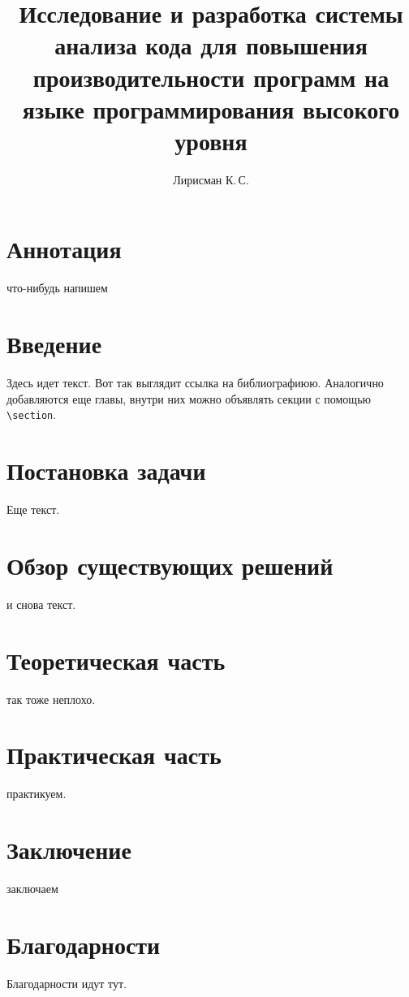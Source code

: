 \documentclass{mipt-thesis-bs}
\title{Исследование и разработка системы анализа кода для повышения производительности программ на языке программирования высокого уровня}
\author{Лирисман К.\,С.}
\begin{document}
\frontmatter
\titlecontents

\chapter{Аннотация}
что-нибудь напишем

\mainmatter


\chapter{Введение}

Здесь идет текст. Вот так выглядит ссылка на библиографиюю. Аналогично добавляются еще главы, внутри них можно объявлять секции с помощью \verb|\section|.



\chapter{Постановка задачи}
Еще текст.

\chapter{Обзор существующих решений}
и снова текст.


\chapter{Теоретическая часть}
так тоже неплохо.

\chapter{Практическая часть}
практикуем.

\chapter{Заключение}
заключаем

\backmatter


\chapter{Благодарности}

Благодарности идут тут.
\end{document}

